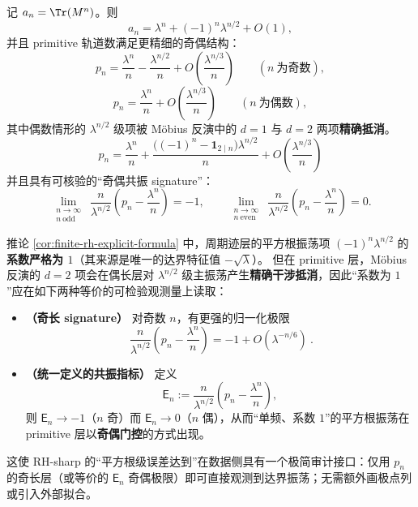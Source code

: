 \begin{corollary}\label{cor:finite-rh-explicit-formula}
记 $a_n=\Tr(M^n)$。则
\[
a_n=\lambda^n+(-1)^n\lambda^{n/2}+O(1),
\]
并且 primitive 轨道数满足更精细的奇偶结构：
\[
p_n=\frac{\lambda^n}{n}-\frac{\lambda^{n/2}}{n}+O\!\left(\frac{\lambda^{n/3}}{n}\right)\qquad(n\ \text{为奇数}),
\]
\[
p_n=\frac{\lambda^n}{n}+O\!\left(\frac{\lambda^{n/3}}{n}\right)\qquad(n\ \text{为偶数}),
\]
其中偶数情形的 $\lambda^{n/2}$ 级项被 Möbius 反演中的 $d=1$ 与 $d=2$ 两项\textbf{精确抵消}。
\[
\boxed{
\;p_n=\frac{\lambda^n}{n}+\frac{\bigl((-1)^n-\mathbf{1}_{2\mid n}\bigr)\lambda^{n/2}}{n}
+O\!\left(\frac{\lambda^{n/3}}{n}\right)\; }
\]
并且具有可核验的“奇偶共振 signature”：
\[
\lim_{\substack{n\to\infty\\ n\ \mathrm{odd}}}\ \frac{n}{\lambda^{n/2}}\left(p_n-\frac{\lambda^n}{n}\right)=-1,
\qquad
\lim_{\substack{n\to\infty\\ n\ \mathrm{even}}}\ \frac{n}{\lambda^{n/2}}\left(p_n-\frac{\lambda^n}{n}\right)=0.
\]
\end{corollary}

\begin{remark}\label{rem:finite-rh-unit-coefficient-observable}
推论 \ref{cor:finite-rh-explicit-formula} 中，周期迹层的平方根振荡项 \( (-1)^n\lambda^{n/2}\) 的\textbf{系数严格为 \(1\)}（其来源是唯一的达界特征值 \(-\sqrt{\lambda}\)）。
但在 primitive 层，Möbius 反演的 \(d=2\) 项会在偶长层对 \(\lambda^{n/2}\) 级主振荡产生\textbf{精确干涉抵消}，因此“系数为 \(1\)”应在如下两种等价的可检验观测量上读取：
\begin{itemize}
  \item \textbf{（奇长 signature）} 对奇数 \(n\)，有更强的归一化极限
  \[
  \boxed{\ \frac{n}{\lambda^{n/2}}\left(p_n-\frac{\lambda^n}{n}\right)=-1+O(\lambda^{-n/6})\ }.
  \]
  \item \textbf{（统一定义的共振指标）} 定义
  \[
  \mathsf{E}_n:=\frac{n}{\lambda^{n/2}}\left(p_n-\frac{\lambda^n}{n}\right),
  \]
  则 \(\mathsf{E}_n\to -1\)（\(n\) 奇）而 \(\mathsf{E}_n\to 0\)（\(n\) 偶），从而“单频、系数 \(1\)”的平方根振荡在 primitive 层以\textbf{奇偶门控}的方式出现。
\end{itemize}
这使 RH-sharp 的“平方根级误差达到”在数据侧具有一个极简审计接口：仅用 \(p_n\) 的奇长层（或等价的 \(\mathsf{E}_n\) 奇偶极限）即可直接观测到达界振荡；无需额外画极点列或引入外部拟合。
\end{remark}

